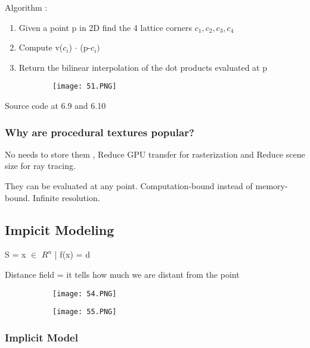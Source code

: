 \documentclass{article}
\begin{document}
Algorithm : 
\begin{enumerate}
    \item Given a point p in 2D find the 4 lattice corners $c_1,c_2,c_3,c_4$
    \item Compute v($c_i$) $\cdot$ (p-$c_i)$
    \item Return the bilinear interpolation of the dot products evaluated at p
\end{enumerate}

\begin{figure}[ht!]
  \centering
  \begin{subfigure}[b]{0.3\linewidth}
    \texttt{[image: 51.PNG]}
  \end{subfigure}
\end{figure}

Source code at 6.9 and 6.10


\subsubsection{Why are procedural textures popular?}

No needs to store them , Reduce GPU transfer for rasterization and Reduce scene size for ray tracing.

They can be evaluated at any point.
Computation-bound instead of memory-bound.
Infinite resolution.

\subsection{Impicit Modeling}

S = {x $\in$ $R^n$ | f(x) = d}

Distance field = it tells how much we are distant from the point

\begin{figure}[ht!]
  \centering
  \begin{subfigure}[b]{0.49\linewidth}
    \texttt{[image: 54.PNG]}
  \end{subfigure}
  \begin{subfigure}[b]{0.5\textwidth}
         \centering
         \texttt{[image: 55.PNG]}
     \end{subfigure}
\end{figure}

\subsubsection{Implicit Model}
\end{document}
